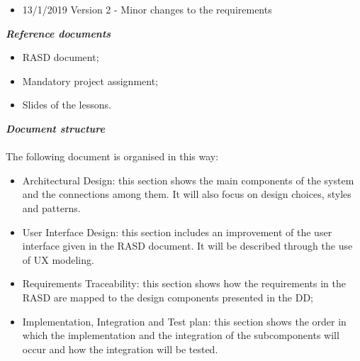 \begin{legal}
\begin{itemize}
				\item 13/1/2019 		Version 2 -  Minor changes to the requirements\\
			\end{itemize}
		\item \textit{\textbf{Reference documents}}\\
			\begin{itemize}
				\item RASD document;
				\item Mandatory project assignment;
				\item Slides of the lessons.\\
			\end{itemize}
		\item \textit{\textbf{Document structure}}\\\\
		The following document is organised in this way:
		\begin{itemize}
				\item Architectural Design: this section shows the main components of the system and the connections among them. It will also focus on design choices, styles and patterns.
				\item User Interface Design: this section includes an improvement of the user interface given in the RASD document. It will be described through the use of UX modeling.
				\item Requirements Traceability: this section shows how the requirements in the RASD are mapped to the design components presented in the DD;
				\item Implementation, Integration and Test plan: this section shows the order in which the implementation and the integration of the subcomponents will occur and how the integration will be tested.\\\\
			\end{itemize}
  	\end{legal}

